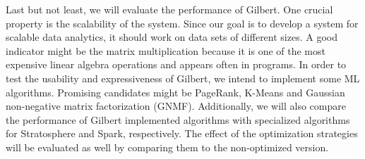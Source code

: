 Last but not least, we will evaluate the performance of Gilbert.
One crucial property is the scalability of the system.
Since our goal is to develop a system for scalable data analytics, it should work on data sets of different sizes.
A good indicator might be the matrix multiplication because it is one of the most expensive linear algebra operations and appears often in programs.
In order to test the usability and expressiveness of Gilbert, we intend to implement some ML algorithms.
Promising candidates might be PageRank, K-Means and Gaussian non-negative matrix factorization (GNMF).
Additionally, we will also compare the performance of Gilbert implemented algorithms with specialized algorithms for Stratosphere and Spark, respectively.
The effect of the optimization strategies will be evaluated as well by comparing them to the non-optimized version.